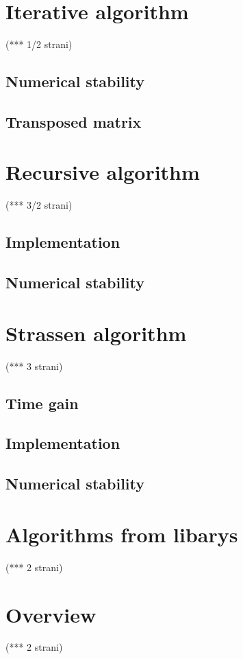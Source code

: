 \documentclass[a4paper,11pt]{article}
\begin{document}

\section{Iterative algorithm}
(*** 1/2 strani)
\subsection{Numerical stability}

\subsection{Transposed matrix}

\section{Recursive algorithm}
(*** 3/2 strani)
\subsection{Implementation}

\subsection{Numerical stability}

\section{Strassen algorithm}
(*** 3 strani)
\subsection{Time gain}

\subsection{Implementation}

\subsection{Numerical stability}

\section{Algorithms from libarys}
(*** 2 strani)
\section{Overview}
(*** 2 strani)
\end{document}

